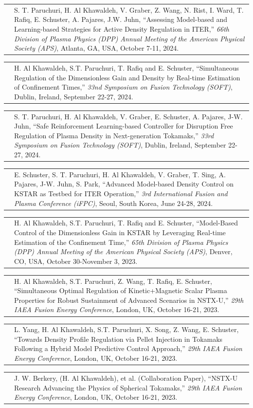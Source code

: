 \documentclass[11pt,letterpaper]{article}
\makeatletter
\newcommand{\CVItem}[2]{%
  \begin{tabularx}{\textwidth}{@{}p{0.83in}@{\hspace{0.15in}}X@{}}
    \raggedleft{#1} & #2\\[3pt]
  \end{tabularx}
}
\makeatother
\begin{document}
\CVItem{[9]}{S. T. Paruchuri, H. Al Khawaldeh, V. Graber, Z. Wang, N. Rist, I. Ward, T. Rafiq, E. Schuster, A. Pajares, J.W. Juhn, ``Assessing Model-based and Learning-based Strategies for Active Density Regulation in ITER,'' \textit{66th Division of Plasma Physics (DPP) Annual Meeting of the American Physical Society (APS)}, Atlanta, GA, USA, October 7-11, 2024.}

\CVItem{[10]}{H. Al Khawaldeh, S.T. Paruchuri, T. Rafiq and E. Schuster, ``Simultaneous Regulation of the Dimensionless Gain and Density by Real-time Estimation of Confinement Times,'' \textit{33nd Symposium on Fusion Technology (SOFT)}, Dublin, Ireland, September 22-27, 2024.}

\CVItem{[11]}{S. T. Paruchuri, H. Al Khawaldeh, V. Graber, E. Schuster, A. Pajares, J-W. Juhn, ``Safe Reinforcement Learning-based Controller for Disruption Free Regulation of Plasma Density in Next-generation Tokamaks,'' \textit{33rd Symposium on Fusion Technology (SOFT)}, Dublin, Ireland, September 22-27, 2024. }

\CVItem{[12]}{E. Schuster, S. T. Paruchuri, H. Al Khawaldeh, V. Graber, T. Sing, A. Pajares, J-W. Juhn, S. Park, ``Advanced Model-based Density Control on KSTAR as Testbed for ITER Operation,'' \textit{3rd International Fusion and Plasma Conference (iFPC)}, Seoul, South Korea, June 24-28, 2024. }

\CVItem{[13]}{H. Al Khawaldeh, S.T. Paruchuri, T. Rafiq and E. Schuster, ``Model-Based Control of the Dimensionless Gain in KSTAR by Leveraging Real-time Estimation of the Confinement Time,'' \textit{65th Division of Plasma Physics (DPP) Annual Meeting of the American Physical Society (APS)}, Denver, CO, USA, October 30-November 3, 2023. }

\CVItem{[14]}{H. Al Khawaldeh, S.T. Paruchuri, Z. Wang, T. Rafiq, E. Schuster, ``Simultaneous Optimal Regulation of Kinetic+Magnetic Scalar Plasma Properties for Robust Sustainment of Advanced Scenarios in NSTX-U,'' \textit{29th IAEA Fusion Energy Conference}, London, UK, October 16-21, 2023. }

\CVItem{[15]}{L. Yang, H. Al Khawaldeh, S.T. Paruchuri, X. Song, Z. Wang, E. Schuster, ``Towards Density Profile Regulation via Pellet Injection in Tokamaks Following a Hybrid Model Predictive Control Approach,'' \textit{29th IAEA Fusion Energy Conference}, London, UK, October 16-21, 2023.}

\CVItem{[16]}{J. W. Berkery, (H. Al Khawaldeh), et al. (Collaboration Paper), ``NSTX-U Research Advancing the Physics of Spherical Tokamaks,'' \textit{29th IAEA Fusion Energy Conference}, London, UK, October 16-21, 2023.}
\end{document}
